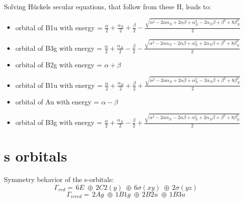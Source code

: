 \documentclass[12pt,a4paper]{article}
\begin{document}
Solving Hückels secular equations, that follow from these H, leads to:
\begin{itemize}
\item orbital of B1u with energy = $\frac{\alpha}{2} + \frac{\alpha_{N}}{2} + \frac{\beta}{2} - \frac{\sqrt{\alpha^{2} - 2 \alpha \alpha_{N} + 2 \alpha \beta + \alpha_{N}^{2} - 2 \alpha_{N} \beta + \beta^{2} + 8 \beta_{N}^{2}}}{2}$
\item orbital of B3g with energy = $\frac{\alpha}{2} + \frac{\alpha_{N}}{2} - \frac{\beta}{2} - \frac{\sqrt{\alpha^{2} - 2 \alpha \alpha_{N} - 2 \alpha \beta + \alpha_{N}^{2} + 2 \alpha_{N} \beta + \beta^{2} + 8 \beta_{N}^{2}}}{2}$
\item orbital of B2g with energy = $\alpha + \beta$
\item orbital of B1u with energy = $\frac{\alpha}{2} + \frac{\alpha_{N}}{2} + \frac{\beta}{2} + \frac{\sqrt{\alpha^{2} - 2 \alpha \alpha_{N} + 2 \alpha \beta + \alpha_{N}^{2} - 2 \alpha_{N} \beta + \beta^{2} + 8 \beta_{N}^{2}}}{2}$
\item orbital of Au with energy = $\alpha - \beta$
\item orbital of B3g with energy = $\frac{\alpha}{2} + \frac{\alpha_{N}}{2} - \frac{\beta}{2} + \frac{\sqrt{\alpha^{2} - 2 \alpha \alpha_{N} - 2 \alpha \beta + \alpha_{N}^{2} + 2 \alpha_{N} \beta + \beta^{2} + 8 \beta_{N}^{2}}}{2}$
\end{itemize}



\newpage \section*{s orbitals}
Symmetry behavior of the s-orbitals:
$$\Gamma_{red} = \,6 E\;\oplus{}\,2 C2(y)\;\oplus{}\,6 \sigma (xy)\;\oplus{}\,2 \sigma (yz)\;$$
$$\Gamma_{irred} = \,2 Ag\;\oplus{}\,1 B1g\;\oplus{}\,2 B2u\;\oplus{}\,1 B3u\;$$
\end{document}
